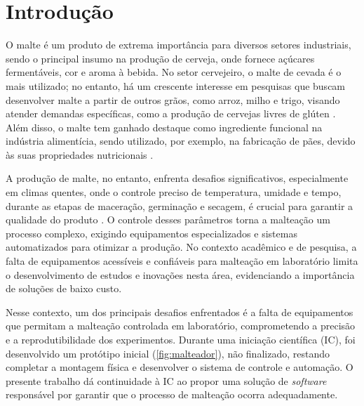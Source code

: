 \chapter[Introdução]{Introdução}

O malte é um produto de extrema importância para diversos setores industriais, sendo o principal insumo na produção de cerveja, onde fornece açúcares fermentáveis, cor e aroma à bebida. No setor cervejeiro, o malte de cevada é o mais utilizado; no entanto, há um crescente interesse em pesquisas que buscam desenvolver malte a partir de outros grãos, como arroz, milho e trigo, visando atender demandas específicas, como a produção de cervejas livres de glúten \cite{CECCARONI2019}. Além disso, o malte tem ganhado destaque como ingrediente funcional na indústria alimentícia, sendo utilizado, por exemplo, na fabricação de pães, devido às suas propriedades nutricionais \cite{KOISTINEN2020}.

A produção de malte, no entanto, enfrenta desafios significativos, especialmente em climas quentes, onde o controle preciso de temperatura, umidade e tempo, durante as etapas de maceração, germinação e secagem, é crucial para garantir a qualidade do produto \cite{KOVALOVA2024}. O controle desses parâmetros torna a malteação um processo complexo, exigindo equipamentos especializados e sistemas automatizados para otimizar a produção. No contexto acadêmico e de pesquisa, a falta de equipamentos acessíveis e confiáveis para malteação em laboratório limita o desenvolvimento de estudos e inovações nesta área, evidenciando a importância de soluções de baixo custo.

Nesse contexto, um dos principais desafios enfrentados é a falta de equipamentos que permitam a malteação controlada em laboratório, comprometendo a precisão e a reprodutibilidade dos experimentos. Durante uma iniciação científica (IC), foi desenvolvido um protótipo inicial (\autoref{fig:malteador}), não finalizado, restando completar a montagem física e desenvolver o sistema de controle e automação. O presente trabalho dá continuidade à IC ao propor uma solução de \textit{software} responsável por garantir que o processo de malteação ocorra adequadamente. 

